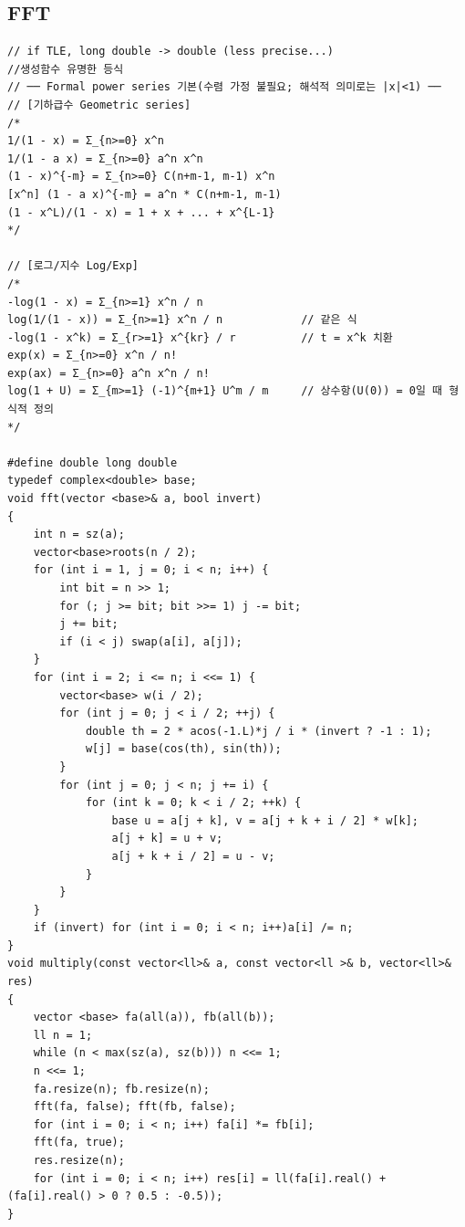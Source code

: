 \documentclass[landscape, 8pt, a4paper, oneside, twocolumn]{extarticle}
\begin{document}
\subsection{FFT}
\begin{verbatim}
// if TLE, long double -> double (less precise...)
//생성함수 유명한 등식
// ── Formal power series 기본(수렴 가정 불필요; 해석적 의미로는 |x|<1) ──
// [기하급수 Geometric series]
/*
1/(1 - x) = Σ_{n>=0} x^n
1/(1 - a x) = Σ_{n>=0} a^n x^n
(1 - x)^{-m} = Σ_{n>=0} C(n+m-1, m-1) x^n
[x^n] (1 - a x)^{-m} = a^n * C(n+m-1, m-1)
(1 - x^L)/(1 - x) = 1 + x + ... + x^{L-1}
*/

// [로그/지수 Log/Exp]
/*
-log(1 - x) = Σ_{n>=1} x^n / n
log(1/(1 - x)) = Σ_{n>=1} x^n / n            // 같은 식
-log(1 - x^k) = Σ_{r>=1} x^{kr} / r          // t = x^k 치환
exp(x) = Σ_{n>=0} x^n / n!
exp(ax) = Σ_{n>=0} a^n x^n / n!
log(1 + U) = Σ_{m>=1} (-1)^{m+1} U^m / m     // 상수항(U(0)) = 0일 때 형식적 정의
*/

#define double long double 
typedef complex<double> base;
void fft(vector <base>& a, bool invert)
{
    int n = sz(a);
    vector<base>roots(n / 2);
    for (int i = 1, j = 0; i < n; i++) {
        int bit = n >> 1;
        for (; j >= bit; bit >>= 1) j -= bit;
        j += bit;
        if (i < j) swap(a[i], a[j]);
    }
    for (int i = 2; i <= n; i <<= 1) {
        vector<base> w(i / 2);
        for (int j = 0; j < i / 2; ++j) {
            double th = 2 * acos(-1.L)*j / i * (invert ? -1 : 1);
            w[j] = base(cos(th), sin(th));
        }
        for (int j = 0; j < n; j += i) {
            for (int k = 0; k < i / 2; ++k) {
                base u = a[j + k], v = a[j + k + i / 2] * w[k];
                a[j + k] = u + v;
                a[j + k + i / 2] = u - v;
            }
        }
    }
    if (invert) for (int i = 0; i < n; i++)a[i] /= n;
}
void multiply(const vector<ll>& a, const vector<ll >& b, vector<ll>& res)
{
    vector <base> fa(all(a)), fb(all(b));
    ll n = 1;
    while (n < max(sz(a), sz(b))) n <<= 1;
    n <<= 1;
    fa.resize(n); fb.resize(n);
    fft(fa, false); fft(fb, false);
    for (int i = 0; i < n; i++) fa[i] *= fb[i];
    fft(fa, true);
    res.resize(n);
    for (int i = 0; i < n; i++) res[i] = ll(fa[i].real() + (fa[i].real() > 0 ? 0.5 : -0.5));
}
\end{verbatim}
\end{document}
